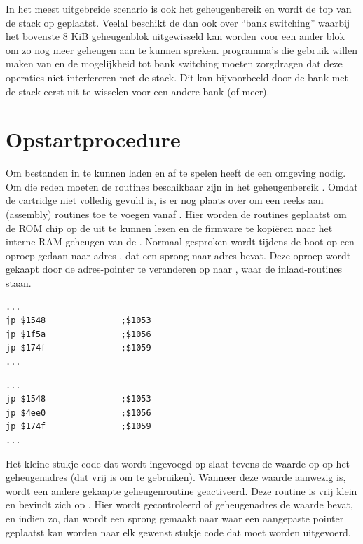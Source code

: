 In het meest uitgebreide scenario is ook het geheugenbereik  en wordt de top van de  stack op  geplaatst. Veelal beschikt de  dan ook over ``bank switching'' waarbij het bovenste 8 KiB geheugenblok uitgewisseld kan worden voor een ander blok om zo nog meer geheugen aan te kunnen spreken.  programma's die gebruik willen maken van  en de mogelijkheid tot bank switching moeten zorgdragen dat deze operaties niet interfereren met de  stack. Dit kan bijvoorbeeld door de bank met de  stack eerst uit te wisselen voor een andere bank (of meer).

%
%
%
\section{Opstartprocedure}

Om  bestanden in te kunnen laden en af te spelen heeft de \product een  omgeving nodig. Om die reden moeten de  routines beschikbaar zijn in het geheugenbereik . Omdat de  cartridge niet volledig gevuld is, is er nog plaats over om een reeks aan (assembly) routines toe te voegen vanaf . Hier worden de routines geplaatst om de ROM chip op de  uit te kunnen lezen en de firmware te kopiëren naar het interne RAM geheugen van de . Normaal gesproken wordt tijdens de  boot op  een oproep gedaan naar adres , dat een sprong naar adres  bevat. Deze oproep wordt gekaapt door de adres-pointer te veranderen op  naar , waar de inlaad-routines staan.

\begin{lstlisting}[caption=Vector tabel in BASIC]
...
jp $1548               ;$1053
jp $1f5a               ;$1056
jp $174f               ;$1059
...
\end{lstlisting}

\begin{lstlisting}[caption=Aangepaste vector tabel in BASIC]
...
jp $1548               ;$1053
jp $4ee0               ;$1056
jp $174f               ;$1059
...
\end{lstlisting}

Het kleine stukje code dat wordt ingevoegd op  slaat tevens de waarde  op op het geheugenadres  (dat vrij is om te gebruiken). Wanneer deze waarde aanwezig is, wordt een andere gekaapte geheugenroutine geactiveerd. Deze routine is vrij klein en bevindt zich op . Hier wordt gecontroleerd of geheugenadres  de waarde  bevat, en indien zo, dan wordt een sprong gemaakt naar  waar een aangepaste pointer geplaatst kan worden naar elk gewenst stukje code dat moet worden uitgevoerd.

